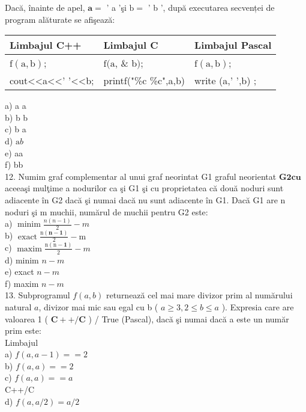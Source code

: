 Dacă, înainte de apel, $\mathbf{a =}$ ' a 'şi $\mathrm{b}=$ ' b ', după executarea secvenței de program alăturate se afişează:

\begin{center}
\begin{tabular}{|l|l|l|}
\hline
Limbajul C++ & Limbajul C & Limbajul Pascal \\
\hline
$\mathrm{f}(\mathrm{a}, \mathrm{b})$; & $\mathrm{f}(\mathrm{a}$, \& b$)$; & $\mathrm{f}(\mathrm{a}, \mathrm{b})$; \\
\hline
cout<<a<<' '<<b; & printf("\%c \%c",a,b) & write (a,' ',b) ; \\
\hline
\end{tabular}
\end{center}

a) a a\\
b) b b\\
c) b a\\
d) $\mathrm{a} b$\\
e) aa\\
f) bb\\
12. Numim graf complementar al unui graf neorintat G1 graful neorientat $\mathbf{G 2} \mathbf{c u}$ aceeaşi mulţime a nodurilor ca şi G1 şi cu proprietatea că două noduri sunt adiacente în G2 dacă şi numai dacă nu sunt adiacente în G1. Dacă G1 are n noduri şi m muchii, numărul de muchii pentru G2 este:\\
a) $\operatorname{minim} \frac{n(n-1)}{2}-m$\\
b) $\operatorname{exact} \frac{\mathrm{n}(\mathbf{n}-\mathbf{1})}{2}-\mathrm{m}$\\
c) $\operatorname{maxim} \frac{\mathrm{n}(\mathrm{n}-\mathbf{1})}{2}-m$\\
d) minim $n-m$\\
e) exact $n-m$\\
f) maxim $n-m$\\
13. Subprogramul $f(a, b)$ returnează cel mai mare divizor prim al numărului natural $a$, divizor mai mic sau egal cu b ( $a \geq 3,2 \leq b \leq a$ ). Expresia care are valoarea 1 ( $\mathbf{C}++/ \mathbf{C}$ ) / True (Pascal), dacă şi numai dacă a este un număr prim este:\\
Limbajul\\
a) $f(a, a-1)==2$\\
b) $f(a, a)==2$\\
c) $f(a, a)==a$\\
C++/C\\
d) $f(a, a / 2)=a / 2$\\
